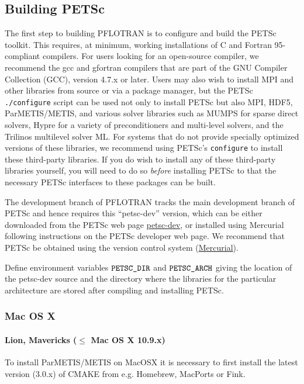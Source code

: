 \subsection{Building PETSc}

The first step to building PFLOTRAN is to configure and build the PETSc 
toolkit.
This requires, at minimum, working installations of C and Fortran 95-compliant 
compilers.
For users looking for an open-source compiler, we recommend the gcc and 
gfortran compilers that are part of the GNU Compiler Collection (GCC), version 
4.7.x or later.
Users may also wish to install MPI and other libraries from source or via a 
package manager, but the PETSc {\tt ./configure} script can be used not only 
to install PETSc but also MPI, HDF5, ParMETIS/METIS, and various solver 
libraries such as MUMPS for sparse direct solvers, Hypre for a variety of 
preconditioners and multi-level solvers, and the Trilinos multilevel solver ML. 
For systems that do not provide specially optimized versions of these 
libraries, we recommend using PETSc's {\tt configure} to install these 
third-party libraries.
If you do wish to install any of these third-party libraries yourself, you 
will need to do so {\it before} installing PETSc to that the necessary PETSc 
interfaces to these packages can be built.

The development branch of PFLOTRAN tracks the main development branch of 
PETSc and hence requires this ``petsc-dev'' version, which can be either 
downloaded from the PETSc web page 
\href{http://www.mcs.anl.gov/petsc/developers/index.html}{petsc-dev}, 
or installed using Mercurial following instructions on the PETSc developer web 
page. 
We recommend that PETSc be obtained using the version control system  
(\href{http://mercurial.selenic.com/wiki}{Mercurial}).

Define environment variables $\verb|PETSC_DIR|$ and $\verb|PETSC_ARCH|$ giving the location of the petsc-dev source and the directory where the libraries for the particular architecture are stored after compiling and installing PETSc.

\subsubsection{Mac OS X}

\paragraph{Lion, Mavericks ($\leq$ Mac OS X 10.9.x)} To install ParMETIS/METIS on MacOSX it is necessary to first install the latest version (3.0.x) of CMAKE from e.g. Homebrew, MacPorts or Fink.

